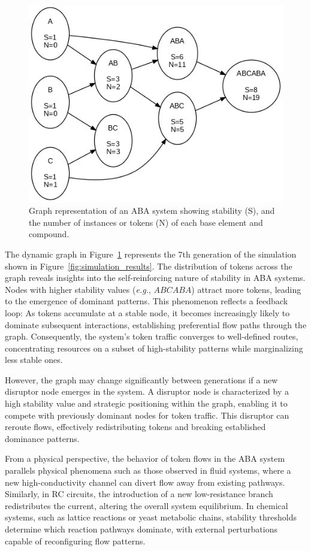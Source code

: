 \documentclass[entropy,article,submit,pdftex,oneauthor]{Definitions/mdpi}
\begin{document}
\begin{figure}[h]
    \centering
    \includegraphics[width=0.5\linewidth]{abc_graph.png}
    \caption{Graph representation of an ABA system showing stability (S), and the number of instances or tokens (N) of each base element and compound.}
    \label{fig:abc_sim}
\end{figure}

The dynamic graph in Figure~\ref{fig:abc_sim} represents the 7th generation of the simulation shown in Figure~\ref{fig:simulation_results}. The distribution of tokens across the graph reveals insights into the self-reinforcing nature of stability in ABA systems. Nodes with higher stability values (\textit{e.g.}, $ABCABA$) attract more tokens, leading to the emergence of dominant patterns. This phenomenon reflects a feedback loop: As tokens accumulate at a stable node, it becomes increasingly likely to dominate subsequent interactions, establishing preferential flow paths through the graph. Consequently, the system's token traffic converges to well-defined routes, concentrating resources on a subset of high-stability patterns while marginalizing less stable ones.

However, the graph may change significantly between generations if a new disruptor node emerges in the system. A disruptor node is characterized by a high stability value and strategic positioning within the graph, enabling it to compete with previously dominant nodes for token traffic. This disruptor can reroute flows, effectively redistributing tokens and breaking established dominance patterns. 

From a physical perspective, the behavior of token flows in the ABA system parallels physical phenomena such as those observed in fluid systems, where a new high-conductivity channel can divert flow away from existing pathways. Similarly, in RC circuits, the introduction of a new low-resistance branch redistributes the current, altering the overall system equilibrium. In chemical systems, such as lattice reactions or yeast metabolic chains, stability thresholds determine which reaction pathways dominate, with external perturbations capable of reconfiguring flow patterns.
\end{document}
